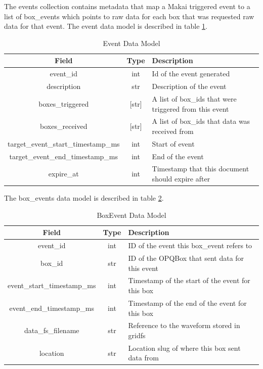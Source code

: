 The events collection contains metadata that map a Makai triggered event to a list of box\_events which points to raw data for each box that was requested raw data for that event. The event data model is described in table \ref{table:Events}.

\begin{table}[H]
	\centering
	\caption{Event Data Model}
	\begin{tabular}{|c|c|p{8cm}|}
		\hline 
		Field & Type & Description \\ 
		\hline
		event\_id & int & Id of the event generated \\
		\hline
		description & str & Description of the event \\
		\hline
		boxes\_triggered & [str] & A list of box\_ids that were triggered from this event \\
		\hline
		boxes\_received & [str] & A list of box\_ids that data was received from \\
		\hline
		target\_event\_start\_timestamp\_ms & int & Start of event \\
		\hline
		target\_event\_end\_timestamp\_ms & int & End of the event \\
		\hline
		expire\_at & int & Timestamp that this document should expire after \\
		\hline
	\end{tabular} 
	\label{table:Events}
\end{table}

The box\_events data model is described in table \ref{table:BoxEvents}.

\begin{table}[H]
	\centering
	\caption{BoxEvent Data Model}
	\begin{tabular}{|c|c|p{8cm}|}
		\hline 
		Field & Type & Description \\ 
		\hline
		event\_id & int & ID of the event this box\_event refers to \\
		\hline
		box\_id & str & ID of the OPQBox that sent data for this event \\
		\hline
		event\_start\_timestamp\_ms & int & Timestamp of the start of the event for this box \\
		\hline
		event\_end\_timestamp\_ms & int & Timestamp of the end of the event for this box \\
		\hline
		data\_fs\_filename & str & Reference to the waveform stored in gridfs \\
		\hline
		location & str & Location slug of where this box sent data from \\
		\hline
	\end{tabular} 
	\label{table:BoxEvents}
\end{table}

